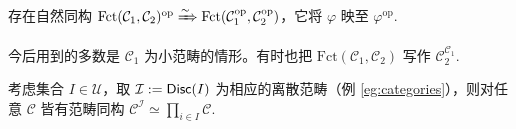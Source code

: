 \begin{proposition}
	存在自然同构 $\mathrm{Fct}(\mathcal{C}_1, \mathcal{C}_2)^\mathrm{op} \xRightarrow{\sim} \mathrm{Fct}(\mathcal{C}_1^{\mathrm{op}}, \mathcal{C}_2^{\mathrm{op}})$，它将 $\varphi$ 映至 $\varphi^\mathrm{op}$.
\end{proposition}

今后用到的多数是 $\mathcal{C}_1$ 为小范畴的情形。有时也把 $\mathrm{Fct}(\mathcal{C}_1, \mathcal{C}_2)$ 写作 $\mathcal{C}_2^{\mathcal{C}_1}$.
\begin{example}
	考虑集合 $I \in \mathcal{U}$，取 $\mathcal{I} := \mathsf{Disc}(I)$ 为相应的离散范畴（例 \ref{eg:categories}），则对任意 $\mathcal{C}$ 皆有范畴同构 $\mathcal{C}^{\mathcal{I}} \simeq \prod_{i \in I} \mathcal{C}$.
\end{example}




